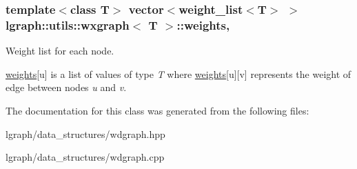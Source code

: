 \subsubsection[{\texorpdfstring{weights}{weights}}]{\setlength{\rightskip}{0pt plus 5cm}template$<$class T$>$ vector$<${\bf weight\+\_\+list}$<$T$>$ $>$ {\bf lgraph\+::utils\+::wxgraph}$<$ T $>$\+::weights\hspace{0.3cm}{\ttfamily [protected]}, {\ttfamily [inherited]}}\hypertarget{classlgraph_1_1utils_1_1wxgraph_a15569c8c0fccb641709dc81eb0e29c94}{}\label{classlgraph_1_1utils_1_1wxgraph_a15569c8c0fccb641709dc81eb0e29c94}


Weight list for each node. 

\hyperlink{classlgraph_1_1utils_1_1wxgraph_a15569c8c0fccb641709dc81eb0e29c94}{weights}\mbox{[}u\mbox{]} is a list of values of type {\itshape T} where \hyperlink{classlgraph_1_1utils_1_1wxgraph_a15569c8c0fccb641709dc81eb0e29c94}{weights}\mbox{[}u\mbox{]}\mbox{[}v\mbox{]} represents the weight of edge between nodes {\itshape u} and {\itshape v}. 

The documentation for this class was generated from the following files\+:\begin{DoxyCompactItemize}
\item 
lgraph/data\+\_\+structures/wdgraph.\+hpp\item 
lgraph/data\+\_\+structures/wdgraph.\+cpp\end{DoxyCompactItemize}
